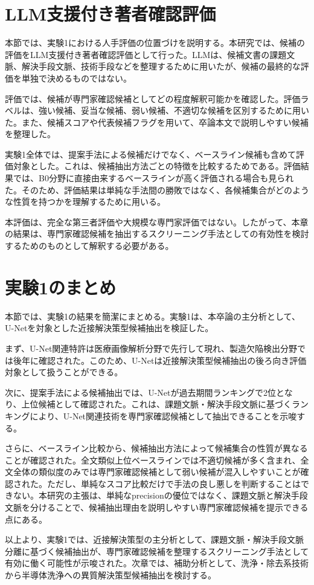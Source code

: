 \section{LLM支援付き著者確認評価}

本節では、実験1における人手評価の位置づけを説明する。本研究では、候補の評価をLLM支援付き著者確認評価として行った。LLMは、候補文書の課題文脈、解決手段文脈、技術手段などを整理するために用いたが、候補の最終的な評価を単独で決めるものではない。

評価では、候補が専門家確認候補としてどの程度解釈可能かを確認した。評価ラベルは、強い候補、妥当な候補、弱い候補、不適切な候補を区別するために用いた。また、候補スコアや代表候補フラグを用いて、卒論本文で説明しやすい候補を整理した。

実験1全体では、提案手法による候補だけでなく、ベースライン候補も含めて評価対象とした。これは、候補抽出方法ごとの特徴を比較するためである。評価結果では、B0分野に直接由来するベースラインが高く評価される場合も見られた。そのため、評価結果は単純な手法間の勝敗ではなく、各候補集合がどのような性質を持つかを理解するために用いる。

本評価は、完全な第三者評価や大規模な専門家評価ではない。したがって、本章の結果は、専門家確認候補を抽出するスクリーニング手法としての有効性を検討するためのものとして解釈する必要がある。

\section{実験1のまとめ}

本節では、実験1の結果を簡潔にまとめる。実験1は、本卒論の主分析として、U-Netを対象とした近接解決策型候補抽出を検証した。

まず、U-Net関連特許は医療画像解析分野で先行して現れ、製造欠陥検出分野では後年に確認された。このため、U-Netは近接解決策型候補抽出の後ろ向き評価対象として扱うことができる。

次に、提案手法による候補抽出では、U-Netが過去期間ランキングで2位となり、上位候補として確認された。これは、課題文脈・解決手段文脈に基づくランキングにより、U-Net関連技術を専門家確認候補として抽出できることを示唆する。

さらに、ベースライン比較から、候補抽出方法によって候補集合の性質が異なることが確認された。全文類似上位ベースラインでは不適切候補が多く含まれ、全文全体の類似度のみでは専門家確認候補として弱い候補が混入しやすいことが確認された。ただし、単純なスコア比較だけで手法の良し悪しを判断することはできない。本研究の主張は、単純なprecisionの優位ではなく、課題文脈と解決手段文脈を分けることで、候補抽出理由を説明しやすい専門家確認候補を提示できる点にある。

以上より、実験1では、近接解決策型の主分析として、課題文脈・解決手段文脈分離に基づく候補抽出が、専門家確認候補を整理するスクリーニング手法として有効に働く可能性が示唆された。次章では、補助分析として、洗浄・除去系技術から半導体洗浄への異質解決策型候補抽出を検討する。
